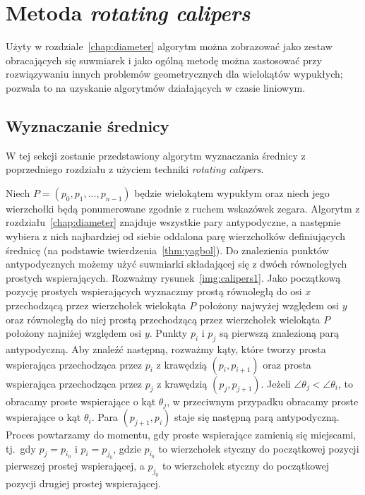 \chapter{Metoda \emph{rotating calipers}\label{chap:calipers}}
Użyty w rozdziale~\ref{chap:diameter} algorytm można zobrazować jako
zestaw obracających się suwmiarek i jako ogólną metodę można
zastosować przy rozwiązywaniu innych problemów geometrycznych dla
wielokątów wypukłych; pozwala to na uzyskanie algorytmów działających
w czasie liniowym.

\section{Wyznaczanie średnicy}
W tej sekcji zostanie przedstawiony algorytm wyznaczania średnicy z
poprzedniego rozdziału z użyciem techniki \emph{rotating calipers}.

Niech $P = (p_0, p_1, \ldots, p_{n-1})$ będzie wielokątem wypukłym
oraz niech jego wierzchołki będą ponumerowane zgodnie z ruchem
wskazówek zegara. Algorytm z rozdziału~\ref{chap:diameter} znajduje
wszystkie pary antypodyczne, a następnie wybiera z nich najbardziej od
siebie oddalona parę wierzchołków definiujących średnicę (na podstawie
twierdzenia~\ref{thm:yagbol}). Do znalezienia punktów antypodycznych
możemy użyć suwmiarki składającej się z dwóch równoległych prostych
wspierających. Rozważmy rysunek~\ref{img:calipers1}. Jako początkową
pozycję prostych wspierających wyznaczmy prostą równoległą do osi $x$
przechodzącą przez wierzchołek wielokąta $P$ położony najwyżej
względem osi $y$ oraz równoległą do niej prostą przechodzącą przez
wierzchołek wielokąta $P$ położony najniżej względem osi $y$. Punkty
$p_i$ i $p_j$ są pierwszą znalezioną parą antypodyczną. Aby znaleźć
następną, rozważmy kąty, które tworzy prosta wspierająca przechodząca
przez $p_i$ z krawędzią $(p_i, p_{i+1})$ oraz prosta wspierająca
przechodząca przez $p_j$ z krawędzią $(p_j, p_{j+1})$.  Jeżeli
$\angle{\theta_j} < \angle{\theta_i}$, to obracamy proste wspierające
o kąt $\theta_j$, w przeciwnym przypadku obracamy proste wspierające o
kąt $\theta_i$. Para $(p_{j+1}, p_i)$ staje się następną parą
antypodyczną. Proces powtarzamy do momentu, gdy proste wspierające
zamienią się miejscami, tj.\ gdy $p_j = p_{i_0}$ i $p_i = p_{j_0}$,
gdzie $p_{i_0}$ to wierzchołek styczny do początkowej pozycji
pierwszej prostej wspierającej, a $p_{j_0}$ to wierzchołek styczny do
początkowej pozycji drugiej prostej wspierającej.

